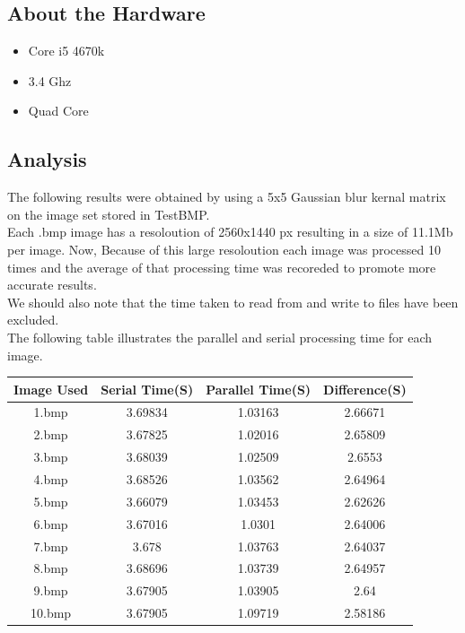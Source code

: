 \documentclass[paper=a4, fontsize=11pt]{scrartcl} %
\numberwithin{equation}{section} %
\numberwithin{figure}{section} %
\numberwithin{table}{section} %
\begin{document}
\subsection{About the Hardware}

\begin{itemize}
\item{Core i5 4670k \\}
\item{3.4 Ghz \\}
\item{Quad Core \\}
\end{itemize}




\subsection{Analysis}
The following results were obtained by using a 5x5 Gaussian blur kernal matrix on the image set stored in TestBMP.\\
Each .bmp image has a resoloution of 2560x1440 px resulting in a size of 11.1Mb per image. Now, Because of this large resoloution each image was processed 10 times and the average of that processing time was recoreded to promote more accurate results.\\


We should also note that the time taken to read from and write to files have been excluded.\\


The following table illustrates the parallel and serial processing time for each image.\\

\begin{center}

\begin{tabular}{||c |c |c |c ||}
\hline
\textbf{Image Used} & \textbf{Serial Time(S)} & \textbf{Parallel Time(S)} & \textbf{Difference(S)} \\[0.5ex]
\hline \hline

1.bmp & 3.69834 & 1.03163 & 2.66671 \\
2.bmp & 3.67825 & 1.02016 & 2.65809\\
3.bmp & 3.68039 & 1.02509 & 2.6553\\
4.bmp & 3.68526 & 1.03562 & 2.64964\\
5.bmp & 3.66079 & 1.03453 & 2.62626\\
6.bmp & 3.67016 & 1.0301 & 2.64006\\
7.bmp & 3.678 & 1.03763 & 2.64037\\
8.bmp & 3.68696 & 1.03739  & 2.64957\\
9.bmp & 3.67905 & 1.03905 & 2.64\\
10.bmp & 3.67905 & 1.09719 & 2.58186\\[1ex]

\hline

\end{tabular}

\end{center}
\end{document}
